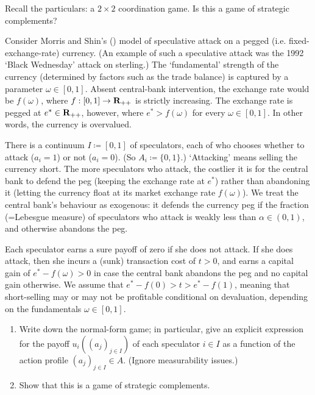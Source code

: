 \begin{namedthm}
	\label{exercise:BoS_spm}
	Recall the particulars: a $2 \times 2$ coordination game. Is this a game of strategic complements?
\end{namedthm}

\begin{exercise}
	\label{exercise:coordinated_attack}
	Consider Morris and Shin's (\citeyear{MorrisShin1998}) model of speculative attack on a pegged (i.e. fixed-exchange-rate) currency. (An example of such a speculative attack was the 1992 `Black Wednesday' attack on sterling.) The `fundamental' strength of the currency (determined by factors such as the trade balance) is captured by a parameter $\omega \in [0,1]$. Absent central-bank intervention, the exchange rate would be $f(\omega)$, where $f : [0,1] \to \mathbf{R}_{++}$ is strictly increasing. The exchange rate is pegged at $e^* \in \mathbf{R}_{++}$, however, where $e^* > f(\omega)$ for every $\omega \in [0,1]$. In other words, the currency is overvalued.

	There is a continuum $I \coloneqq [0,1]$ of speculators, each of who chooses whether to attack ($a_i = 1$) or not ($a_i = 0$). (So $A_i \coloneqq \{0,1\}$.) `Attacking' means selling the currency short. The more speculators who attack, the costlier it is for the central bank to defend the peg (keeping the exchange rate at $e^*$) rather than abandoning it (letting the currency float at its market exchange rate $f(\omega)$). We treat the central bank's behaviour as exogenous: it defends the currency peg if the fraction (=Lebesgue measure) of speculators who attack is weakly less than $\alpha \in (0,1)$, and otherwise abandons the peg.

	Each speculator earns a sure payoff of zero if she does not attack. If she does attack, then she incurs a (sunk) transaction cost of $t > 0$, and earns a capital gain of $e^* - f(\omega) > 0$ in case the central bank abandons the peg and no capital gain otherwise. We assume that $e^* - f(0) > t > e^* - f(1)$, meaning that short-selling may or may not be profitable conditional on devaluation, depending on the fundamentals $\omega \in [0,1]$.

	\begin{enumerate}[label=(\alph*)]
	
		\item Write down the normal-form game; in particular, give an explicit expression for the payoff $u_i((a_j)_{j \in I})$ of each speculator $i \in I$ as a function of the action profile $(a_j)_{j \in I} \in A$. (Ignore measurability issues.)

		\item Show that this is a game of strategic complements.
	
	\end{enumerate}
\end{exercise}

